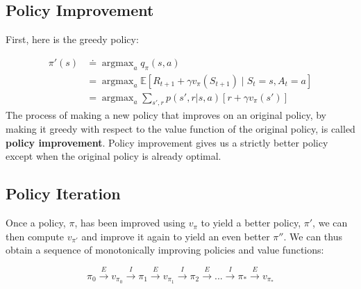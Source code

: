 \documentclass[11pt]{article}
\DeclareMathOperator*{\argmax}{argmax}
\begin{document}
\subsection{Policy Improvement}
\label{sec:orgba945e0}

First, here is the greedy policy:

\begin{equation}
\begin{aligned}
\pi'(s) &\doteq \argmax_{a} q_{\pi}(s,a) \\
        &= \argmax_{a} \mathbb{E}[R_{t+1} + \gamma v_{\pi}(S_{t+1}) \mid S_{t}=s, A_{t}=a] \\
        &= \argmax_{a} \sum\limits_{s',r} p(s',r|s,a)[r+\gamma v_{\pi}(s')]
\end{aligned}
\end{equation}
The process of making a new policy that improves on an original policy, by
making it greedy with respect to the value function of the original policy, is
called \textbf{policy improvement}. Policy improvement gives us a strictly better
policy except when the original policy is already optimal.

\subsection{Policy Iteration}
\label{sec:org68f5e6f}

Once a policy, \(\pi\), has been improved using \(v_{\pi}\) to yield a better
policy, \(\pi'\), we can then compute \(v_{\pi'}\) and improve it again to yield an
even better \(\pi''\). We can thus obtain a sequence of monotonically improving
policies and value functions:

\begin{equation}
\pi_{0} \xrightarrow{E} v_{\pi_{0}} \xrightarrow{I} \pi_{1} \xrightarrow{E} v_{\pi_{1}} \xrightarrow{I} 
\pi_{2} \xrightarrow{E} {...} \xrightarrow{I} \pi_{*} \xrightarrow{E} v_{\pi_{*}}
\end{equation}
\end{document}
